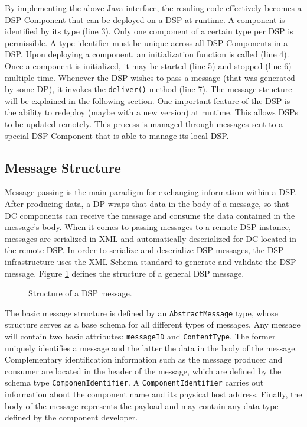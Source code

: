 \documentclass[conference]{IEEEtran}
\begin{document}
By implementing the above Java interface, the resuling code
effectively becomes a DSP Component that can be deployed on a DSP at
runtime. A component is identified by its type (line 3). Only one
component of a certain type per DSP is permissible. A type identifier
must be unique across all DSP Components in a DSP.  Upon deploying a
component, an initialization function is called (line 4). Once a
component is initialized, it may be started (line 5) and stopped (line
6) multiple time. Whenever the DSP wishes to pass a message (that was
generated by some DP), it invokes the \texttt{deliver()} method (line
7). The message structure will be explained in the following section.
One important feature of the DSP is the ability to redeploy (maybe
with a new version) at runtime. This allows DSPs to be updated
remotely. This process is managed through messages sent to a special
DSP Component that is able to manage its local DSP.

\subsection{Message Structure}

Message passing is the main paradigm for exchanging information within
a DSP. After producing data, a DP wraps that data in the body
of a message, so that DC components can receive the message and
consume the data contained in the message's body. When it comes to passing
messages to a remote DSP instance, messages are serialized in XML
\cite{xml2000} and automatically deserialized for DC located in the
remote DSP. In order to serialize and deserialize DSP messages, the
DSP infrastructure uses the XML Schema standard \cite{xml-schema2004}
to generate and validate the DSP message. Figure \ref{FIG_DSP_MESSAGE}
defines the structure of a general DSP message.

\begin{figure}[!htb]
 \centering
 \caption{\label{FIG_DSP_MESSAGE} Structure of a DSP message.}
\end{figure}

The basic message structure is defined by an \texttt{AbstractMessage}
type, whose structure serves as a base schema for all different types
of messages. Any message will contain two basic attributes:
\texttt{messageID} and \texttt{ContentType}.  The former uniquely
identifies a message and the latter the data in the body of the
message. Complementary identification information such as the message
producer and consumer are located in the header of the message, which
are defined by the schema type \texttt{ComponenIdentifier}. A
\texttt{ComponentIdentifier} carries out information about the
component name and its physical host address.  Finally, the body of
the message represents the payload and may contain any data type
defined by the component developer.
\end{document}

